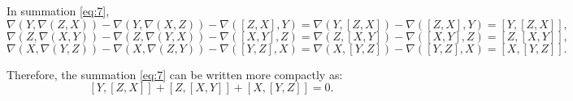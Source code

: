 \documentclass[11pt]{amsart}
\begin{document}
In summation \ref{eq:7}, 
\begin{equation}
\label{eq:8}
\nabla(Y,\nabla(Z,X))-\nabla(Y,\nabla(X,Z))-\nabla(\left [ Z,X \right ],Y)=\nabla(Y,\left [ Z,X \right ])-\nabla(\left [ Z,X \right ],Y)=\left [ Y,\left [ Z,X \right ] \right ],
\end{equation}
\begin{equation}
\label{eq:9}
\nabla(Z,\nabla(X,Y))-\nabla(Z,\nabla(Y,X))-\nabla(\left [ X,Y \right ],Z)=\nabla(Z,\left [ X,Y \right ])-\nabla(\left [ X,Y \right ],Z)=\left [ Z,\left [ X,Y \right ] \right ],
\end{equation}
\begin{equation}
\label{eq:10}
\nabla(X,\nabla(Y,Z))-\nabla(X,\nabla(Z,Y))-\nabla(\left [ Y,Z \right ],X)=\nabla(X,\left [ Y,Z \right ])-\nabla(\left [ Y,Z \right ],X)=\left [ X,\left [ Y,Z \right ] \right ].
\end{equation}

Therefore, the summation \ref{eq:7} can be written more compactly as:
\begin{equation}
\left [ Y,\left [ Z,X \right ] \right ]+\left [ Z,\left [ X,Y \right ] \right ]+\left [ X,\left [ Y,Z \right ] \right ]=0.
\end{equation}
\end{document}

